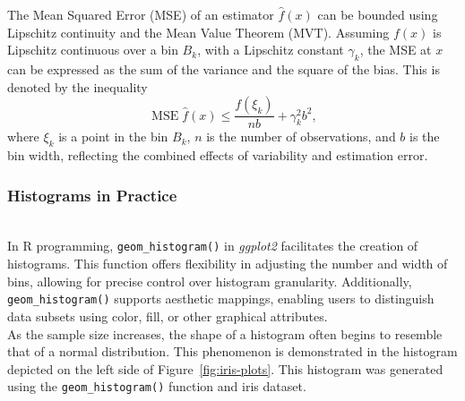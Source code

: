\documentclass{article}\usepackage[]{graphicx}\usepackage[]{xcolor}
\numberwithin{equation}{section}
\begin{document}
\noindent
The Mean Squared Error (MSE) of an estimator $\hat{f}(x)$ can be bounded using Lipschitz continuity and the Mean Value Theorem (MVT). Assuming $f(x)$ is Lipschitz continuous over a bin $B_k$, with a Lipschitz constant $\gamma_k$, the MSE at $x$ can be expressed as the sum of the variance and the square of the bias. This is denoted by the inequality
\begin{equation*}
\operatorname{MSE}\hat{f}(x) \leq \frac{f(\xi_k)}{nb} + \gamma_k^2b^2,
\end{equation*}
where $\xi_k$ is a point in the bin $B_k$, $n$ is the number of observations, and $b$ is the bin width, reflecting the combined effects of variability and estimation error.

\subsubsection{Histograms in Practice}\\

\noindent In R programming, \texttt{geom\_histogram()} in \textit{ggplot2} facilitates the creation of histograms. This function offers flexibility in adjusting the number and width of bins, allowing for precise control over histogram granularity. Additionally, \texttt{geom\_histogram()} supports aesthetic mappings, enabling users to distinguish data subsets using color, fill, or other graphical attributes.\\

\noindent As the sample size increases, the shape of a histogram often begins to resemble that of a normal distribution. This phenomenon is demonstrated in the histogram depicted on the left side of Figure~\ref{fig:iris-plots}. This histogram was generated using the \texttt{geom\_histogram()} function and iris dataset.\\
\end{document}
